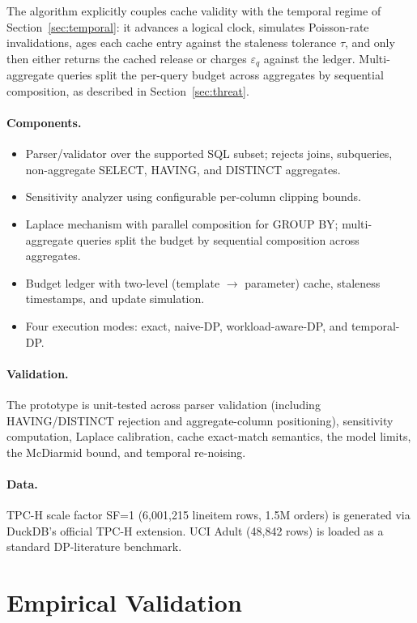 \documentclass[sigconf,nonacm]{acmart}
\newcommand{\eps}{\varepsilon}
\begin{document}
\noindent The algorithm explicitly couples cache validity with the temporal regime of Section~\ref{sec:temporal}: it advances a logical clock, simulates Poisson-rate invalidations, ages each cache entry against the staleness tolerance $\tau$, and only then either returns the cached release or charges $\eps_q$ against the ledger. Multi-aggregate queries split the per-query budget across aggregates by sequential composition, as described in Section~\ref{sec:threat}.

\paragraph{Components.}
\begin{itemize}
    \item Parser/validator over the supported SQL subset; rejects joins, subqueries, non-aggregate SELECT, HAVING, and DISTINCT aggregates.
    \item Sensitivity analyzer using configurable per-column clipping bounds.
    \item Laplace mechanism with parallel composition for GROUP BY; multi-aggregate queries split the budget by sequential composition across aggregates.
    \item Budget ledger with two-level (template $\to$ parameter) cache, staleness timestamps, and update simulation.
    \item Four execution modes: exact, naive-DP, workload-aware-DP, and temporal-DP.
\end{itemize}

\paragraph{Validation.} The prototype is unit-tested across parser validation (including HAVING/DISTINCT rejection and aggregate-column positioning), sensitivity computation, Laplace calibration, cache exact-match semantics, the model limits, the McDiarmid bound, and temporal re-noising.

\paragraph{Data.} TPC-H scale factor SF=1 (6{,}001{,}215 lineitem rows, 1.5M orders) is generated via DuckDB's official TPC-H extension. UCI Adult (48{,}842 rows) is loaded as a standard DP-literature benchmark.

\section{Empirical Validation}
\label{sec:eval}
\end{document}
